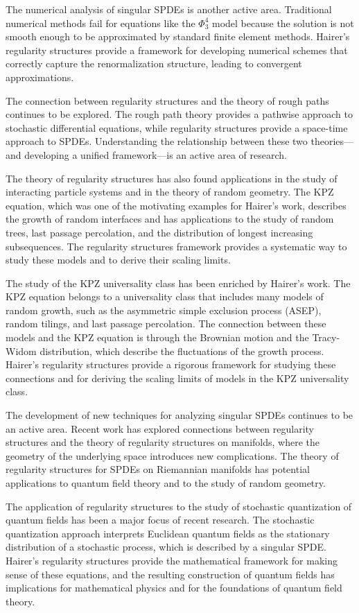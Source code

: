 The numerical analysis of singular SPDEs is another active area. Traditional numerical methods fail for equations like the $\Phi^4_3$ model because the solution is not smooth enough to be approximated by standard finite element methods. Hairer's regularity structures provide a framework for developing numerical schemes that correctly capture the renormalization structure, leading to convergent approximations.

The connection between regularity structures and the theory of rough paths continues to be explored. The rough path theory provides a pathwise approach to stochastic differential equations, while regularity structures provide a space-time approach to SPDEs. Understanding the relationship between these two theories---and developing a unified framework---is an active area of research.

The theory of regularity structures has also found applications in the study of interacting particle systems and in the theory of random geometry. The KPZ equation, which was one of the motivating examples for Hairer's work, describes the growth of random interfaces and has applications to the study of random trees, last passage percolation, and the distribution of longest increasing subsequences. The regularity structures framework provides a systematic way to study these models and to derive their scaling limits.

The study of the KPZ universality class has been enriched by Hairer's work. The KPZ equation belongs to a universality class that includes many models of random growth, such as the asymmetric simple exclusion process (ASEP), random tilings, and last passage percolation. The connection between these models and the KPZ equation is through the Brownian motion and the Tracy-Widom distribution, which describe the fluctuations of the growth process. Hairer's regularity structures provide a rigorous framework for studying these connections and for deriving the scaling limits of models in the KPZ universality class.

The development of new techniques for analyzing singular SPDEs continues to be an active area. Recent work has explored connections between regularity structures and the theory of regularity structures on manifolds, where the geometry of the underlying space introduces new complications. The theory of regularity structures for SPDEs on Riemannian manifolds has potential applications to quantum field theory and to the study of random geometry.

The application of regularity structures to the study of stochastic quantization of quantum fields has been a major focus of recent research. The stochastic quantization approach interprets Euclidean quantum fields as the stationary distribution of a stochastic process, which is described by a singular SPDE. Hairer's regularity structures provide the mathematical framework for making sense of these equations, and the resulting construction of quantum fields has implications for mathematical physics and for the foundations of quantum field theory.

